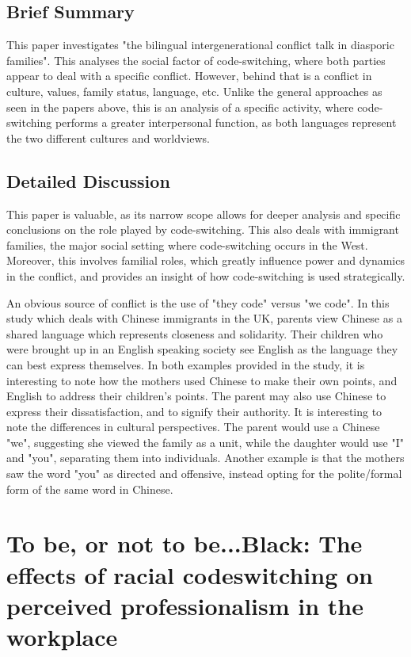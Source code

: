 \documentclass[12pt]{article}
\begin{document}
\subsection{Brief Summary}

This paper investigates "the bilingual intergenerational conflict talk in diasporic families". This analyses the social factor of code-switching, where both parties appear to deal with a specific conflict. However, behind that is a conflict in culture, values, family status, language, etc. Unlike the general approaches as seen in the papers above, this is an analysis of a specific activity, where code-switching performs a greater interpersonal function, as both languages represent the two different cultures and worldviews.

\subsection{Detailed Discussion}

This paper is valuable, as its narrow scope allows for deeper analysis and specific conclusions on the role played by code-switching. This also deals with immigrant families, the major social setting where code-switching occurs in the West. Moreover, this involves familial roles, which greatly influence power and dynamics in the conflict, and provides an insight of how code-switching is used strategically.

An obvious source of conflict is the use of "they code" versus "we code". In this study which deals with Chinese immigrants in the UK, parents view Chinese as a shared language which represents closeness and solidarity. Their children who were brought up in an English speaking society see English as the language they can best express themselves. In both examples provided in the study, it is interesting to note how the mothers used Chinese to make their own points, and English to address their children's points. The parent may also use Chinese to express their dissatisfaction, and to signify their authority. It is interesting to note the differences in cultural perspectives. The parent would use a Chinese "we", suggesting she viewed the family as a unit, while the daughter would use "I" and "you", separating them into individuals. Another example is that the mothers saw the word "you" as directed and offensive, instead opting for the polite/formal form of the same word in Chinese.


\section{To be, or not to be...Black: The effects of racial codeswitching on perceived professionalism in the workplace~\cite{race}}
\end{document}
